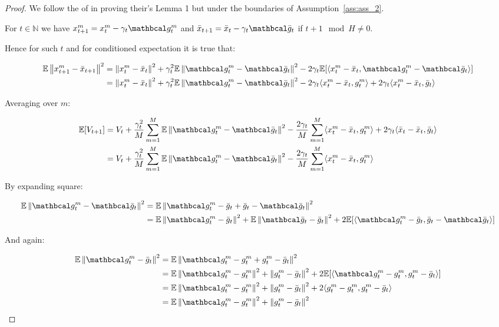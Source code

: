 \begin{proof}
    We follow the of \cite{Khaled} in proving their's Lemma 1 but under the boundaries of Assumption~\ref{ass:ass_2}.

    For $t \in \mathbb{N}$ we have $x^m_{t+1} = x^m_t - \gamma_{t} \mc{g}^m_t$ 
    and $\bar{x}_{t+1} = \bar{x}_t - \gamma_{t} \mc{\bar{g}}_t$
    if $t + 1 \mod H \neq 0$. 
    
    Hence for such $t$ and for conditioned expectation it is true that:

    \begin{align}
        \E \norm{x^m_{t+1} - \bar{x}_{t+1}}^2 
        &= \norm{x^m_t - \bar{x}_t}^2 + \gamma_{t}^2 \E \norm{\mc{g}^m_t - \mc{\bar{g}}_t}^2 - 2\gamma_{t} \E [\inner{x^m_t - \bar{x}_t}{\mc{g}^m_t - \mc{\bar{g}}_t}] \\
        &= \norm{x^m_t - \bar{x}_t}^2 + \gamma_{t}^2 \E \norm{\mc{g}^m_t - \mc{\bar{g}}_t}^2 - 2\gamma_{t} \inner{x^m_t - \bar{x}_t}{g^m_t} + 2\gamma_{t} \inner {x^m_t - \bar{x}_t}{\bar{g}_t}
    \end{align}

    Averaging over $m$:

    \begin{align}
        \E [V_{t+1}] 
        &=
        V_t + \frac{\gamma_{t}^2}{M} \summ{m=1}{M} \E \norm{\mc{g}^m_t - \mc{\bar{g}}_t}^2 - \frac{2\gamma_{t}}{M} \summ{m=1}{M} \inner{x^m_t - \bar{x}_t}{g^m_t} + 2\gamma_{t} \inner {\bar{x}_t - \bar{x}_t}{\bar{g}_t}  \\
        &=
        V_t + \frac{\gamma_{t}^2}{M} \summ{m=1}{M} \E \norm{\mc{g}^m_t - \mc{\bar{g}}_t}^2 - \frac{2\gamma_{t}}{M} \summ{m=1}{M} \inner{x^m_t - \bar{x}_t}{g^m_t} \label{eq:1904_4}
    \end{align}

    By expanding square:

    \begin{align} 
        \E \norm{\mc{g}^m_t - \mc{\bar{g}}_t}^2
        &= \E \norm{\mc{g}^m_t - \bar{g}_t + \bar{g}_t - \mc{\bar{g}}_t}^2 \\
        &= 
        \E \norm{\mc{g}^m_t - \bar{g}_t}^2 + \E \norm{\mc{\bar{g}}_t - \bar{g}_t}^2 + 2\E [\inner{\mc{g}^m_t - \bar{g}_t}{\bar{g}_t - \mc{\bar{g}}_t}] \label{eq:1904_1}
    \end{align}

    And again:

    \begin{align}
        \E \norm{\mc{g}^m_t - \bar{g}_t}^2 
        &= \E \norm{\mc{g}^m_t - g^m_t + g^m_t - \bar{g}_t}^2 \\
        &= \E \norm{\mc{g}^m_t - g^m_t}^2 
        + \norm{g^m_t - \bar{g}_t}^2
        + 2\E[\inner{\mc{g}^m_t - g^m_t}{g^m_t - \bar{g}_t}] \\
        &= \E \norm{\mc{g}^m_t - g^m_t}^2 
        + \norm{g^m_t - \bar{g}_t}^2
        + 2 \inner{g^m_t - g^m_t}{g^m_t - \bar{g}_t} \\
        &= \E \norm{\mc{g}^m_t - g^m_t}^2 
        + \norm{g^m_t - \bar{g}_t}^2 \label{eq:1904_2}
    \end{align}


\end{proof}
